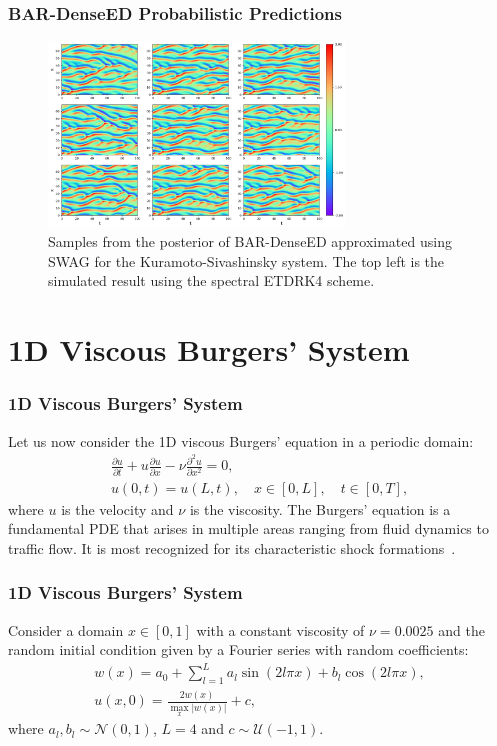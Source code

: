 \documentclass{beamer}
\theoremstyle{remark}
\newcommand{\viscosity}{\nu}
\newcommand{\mc}{\mathcal}
\begin{document}
\begin{frame}
\frametitle{BAR-DenseED Probabilistic Predictions}
\begin{figure}[H]
    \centering
    \includegraphics[width=0.7\textwidth]{Fig08.png}
    \caption{Samples from the posterior of BAR-DenseED approximated using SWAG for the Kuramoto-Sivashinsky system. The top left is the simulated result using the spectral ETDRK4 scheme.} 
    \label{fig:ks-bar-samples}
\end{figure}
\end{frame}


\section{1D Viscous Burgers' System}

\begin{frame}
\frametitle{1D Viscous Burgers' System}
Let us now consider the 1D viscous Burgers' equation in a periodic domain:
\begin{gather}
    \frac{\partial u}{\partial t} + u\frac{\partial u}{\partial x} - \viscosity \frac{\partial^{2} u}{\partial x^{2}} = 0,\\
     u(0,t) = u(L,t), \quad x\in[0,L], \quad t\in[0,T],
\end{gather}
where $u$ is the velocity and $\viscosity$ is the viscosity.
The Burgers' equation is a fundamental PDE that arises in multiple areas ranging from fluid dynamics to traffic flow. It is most recognized for its characteristic shock formations~\cite{whitham2011linear}.
\end{frame}

\begin{frame}
\frametitle{1D Viscous Burgers' System}
Consider a domain $x\in[0,1]$ with a constant viscosity of $\viscosity = 0.0025$ and the random initial condition given by a Fourier series with random coefficients:
\begin{equation}
    \begin{gathered}
    w(x) = a_0 + \sum_{l=1}^L a_l \sin(2l\pi x) + b_l \cos(2l\pi x), \\
    u(x,0) = \frac{2w(x)}{\max_x |w(x)|} + c,
    \label{eq:burger1d-initial}
    \end{gathered}
\end{equation}
where $a_l, b_l \sim \mc N(0, 1)$, $L=4$ and $c\sim \mc U(-1, 1)$.
\end{frame}
\end{document}
